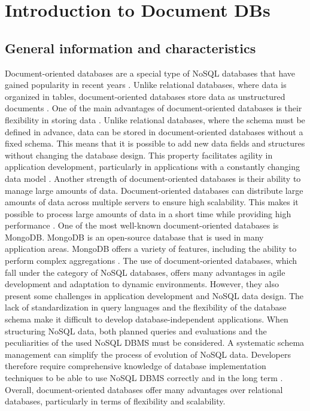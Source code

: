 
\section{Introduction to Document DBs}


\subsection{General information and characteristics}
Document-oriented databases are a special type of NoSQL databases that have gained popularity in recent years \parencite[p. 487]{Bach2016}. 
Unlike relational databases, where data is organized in tables, document-oriented databases  store data as unstructured documents \parencite[p. 493]{Bach2016}.
One of the main advantages of document-oriented databases is their flexibility in storing data \parencite[p. 488]{Bach2016}. Unlike relational databases, 
where the schema must be defined in advance, data can be stored in document-oriented databases without a fixed schema. 
This means that it is possible to add new data fields and structures without changing the database design. 
This property facilitates agility in application development, particularly in applications with a constantly changing data model \parencite[p. 486]{Bach2016}.
Another strength of document-oriented databases is their ability to manage large amounts of data. 
Document-oriented databases can distribute large amounts of data across multiple servers to ensure high scalability. 
This makes it possible to process large amounts of data in a short time while providing high performance \parencite[p. 487]{Bach2016}.
One of the most well-known document-oriented databases is MongoDB. MongoDB is an open-source database that is used in many application areas. 
MongoDB offers a variety of features, including the ability to perform complex aggregations \parencite[p. 495]{Bach2016}.
The use of document-oriented databases, which fall under the category of NoSQL databases, offers many advantages 
in agile development and adaptation to dynamic environments. 
However, they also present some challenges in application development and NoSQL data design. 
The lack of standardization in query languages and the flexibility of the database schema make it difficult to develop database-independent applications. 
When structuring NoSQL data, both planned queries and evaluations and the peculiarities of the used NoSQL DBMS must be considered. 
A systematic schema management can simplify the process of evolution of NoSQL data. 
Developers therefore require comprehensive knowledge of database implementation techniques to be able to use NoSQL DBMS correctly and in the long term \parencite[p. 441]{Klettke2016}.
Overall, document-oriented databases offer many advantages over relational databases, particularly in terms of flexibility and scalability.



